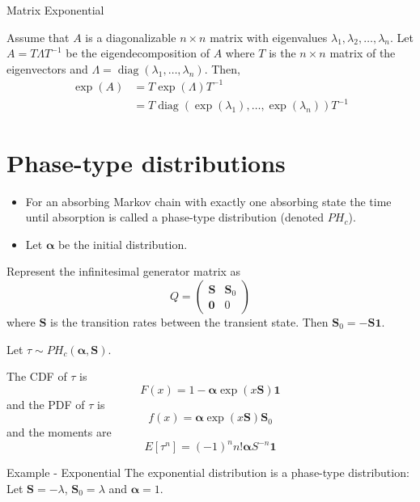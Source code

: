 \documentclass{beamer}
\theoremstyle{definition}
\begin{document}
\begin{frame}{Matrix Exponential}
\begin{theorem} \label{thm:eigen_matrix_exp}
Assume that $A$ is a diagonalizable $n \times n$ matrix with eigenvalues $\lambda_1, \lambda_2, \ldots, \lambda_n$.
Let $A = T \Lambda T^{-1}$ be the eigendecomposition of $A$ where $T$ is the $n \times n$ matrix of the eigenvectors and $\Lambda = \operatorname{diag}(\lambda_1, \ldots, \lambda_n)$.
Then,
\begin{align*}
    \exp(A) &= T \exp(\Lambda) T^{-1}\\
    &= T \operatorname{diag}(\exp(\lambda_1), \ldots, \exp(\lambda_n)) T^{-1}
\end{align*}
\end{theorem}
\end{frame}

\section{Phase-type distributions}

\begin{frame}
\begin{itemize}
    \item For an absorbing Markov chain with exactly one absorbing state the time until absorption is called a phase-type distribution (denoted $PH_c$).
    \item Let $\boldsymbol{\alpha}$ be the initial distribution.
\end{itemize}
Represent the infinitesimal generator matrix as
$$
Q = \begin{pmatrix}
\mathbf{S} & \mathbf{S}_0\\
\mathbf{0} & 0
\end{pmatrix}
$$
where $\mathbf{S}$ is the transition rates between the transient state.
Then $\mathbf{S}_0 = - \mathbf{S 1}$.
\end{frame}

\begin{frame}
Let $\tau \sim PH_c(\boldsymbol{\alpha}, \mathbf{S})$.

The CDF of $\tau$ is
$$ 
F(x) = 1 - \boldsymbol{\alpha} \exp(x \mathbf{S}) \mathbf{1}
$$
and the PDF of $\tau$ is
$$
f(x) = \boldsymbol{\alpha} \exp(x \mathbf{S}) \mathbf{S}_0
$$  
and the moments are
$$
E[\tau^{{n}}]=(-1)^{{n}}n!{\boldsymbol  {\alpha }}{S}^{{-n}}{\mathbf  {1}}
$$
\end{frame}

\begin{frame}{Example - Exponential}
The exponential distribution is a phase-type distribution:
Let $\mathbf S = - \lambda$, $\mathbf{S}_0 = \lambda$ and $\boldsymbol{\alpha} = 1$.
\end{frame}
\end{document}
